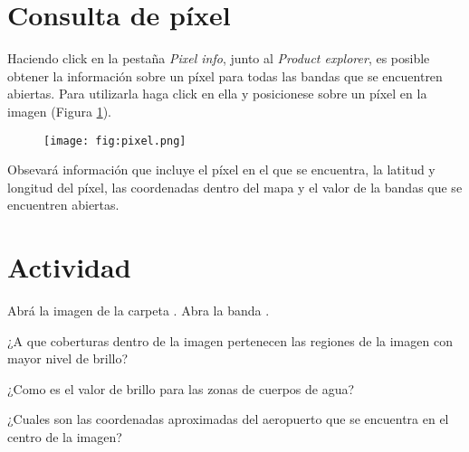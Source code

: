 \section{Consulta de píxel}

Haciendo click en la pestaña \emph{Pixel info}, junto al \emph{Product explorer}, es posible obtener la información sobre un píxel para todas las bandas que se encuentren abiertas. Para utilizarla haga click en ella y posicionese sobre un píxel en la imagen (Figura \ref{fig:pixel}).

\begin{figure}[h!]
    \centering
    \texttt{[image: fig:pixel.png]}
    \caption{}
    \label{fig:pixel}
\end{figure}

Obsevará información que incluye el píxel en el que se encuentra, la latitud y longitud del píxel, las coordenadas dentro del mapa y el valor de la bandas que se encuentren abiertas.

\section{Actividad}

Abrá la imagen  de la  carpeta . Abra la banda .

\begin{que}
    ¿A que coberturas dentro de la imagen pertenecen las regiones de la imagen con mayor nivel de brillo?
\end{que}

\begin{que}
    ¿Como es el valor de brillo para las zonas de cuerpos de agua?
\end{que}

\begin{que}
    ¿Cuales son las coordenadas aproximadas del aeropuerto que se encuentra en el centro de la imagen?
\end{que}
